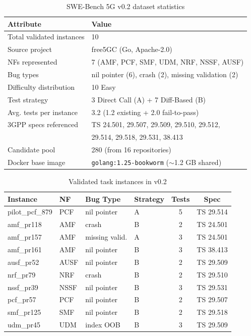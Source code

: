 \documentclass{article}
\begin{document}
\begin{table}[h]
\centering
\caption{SWE-Bench 5G v0.2 dataset statistics}
\label{tab:dataset_stats}
\begin{tabular}{ll}
\toprule
\textbf{Attribute} & \textbf{Value} \\
\midrule
Total validated instances  & 10 \\
Source project             & free5GC (Go, Apache-2.0) \\
NFs represented            & 7 (AMF, PCF, SMF, UDM, NRF, NSSF, AUSF) \\
Bug types                  & nil pointer (6), crash (2), missing validation (2) \\
Difficulty distribution    & 10 Easy \\
Test strategy              & 3 Direct Call (A) + 7 Diff-Based (B) \\
Avg. tests per instance    & 3.2 (1.2 existing + 2.0 fail-to-pass) \\
3GPP specs referenced      & TS 24.501, 29.507, 29.509, 29.510, 29.512, \\
                           & 29.514, 29.518, 29.531, 38.413 \\
Candidate pool             & 280 (from 16 repositories) \\
Docker base image          & \texttt{golang:1.25-bookworm} ($\sim$1.2 GB shared) \\
\bottomrule
\end{tabular}
\end{table}

\begin{table}[h]
\centering
\caption{Validated task instances in v0.2}
\label{tab:instances}
\begin{tabular}{llllcc}
\toprule
\textbf{Instance} & \textbf{NF} & \textbf{Bug Type} & \textbf{Strategy} & \textbf{Tests} & \textbf{Spec} \\
\midrule
pilot\_pcf\_879 & PCF  & nil pointer     & A & 5 & TS 29.514 \\
amf\_pr118      & AMF  & crash           & B & 2 & TS 24.501 \\
amf\_pr157      & AMF  & missing valid.  & A & 3 & TS 24.501 \\
amf\_pr161      & AMF  & nil pointer     & B & 3 & TS 38.413 \\
ausf\_pr52      & AUSF & nil pointer     & B & 2 & TS 29.509 \\
nrf\_pr79       & NRF  & crash           & B & 2 & TS 29.510 \\
nssf\_pr39      & NSSF & nil pointer     & B & 3 & TS 29.531 \\
pcf\_pr57       & PCF  & nil pointer     & B & 2 & TS 29.507 \\
smf\_pr125      & SMF  & nil pointer     & B & 2 & TS 29.518 \\
udm\_pr45       & UDM  & index OOB       & B & 3 & TS 29.509 \\
\bottomrule
\end{tabular}
\end{table}
\end{document}
